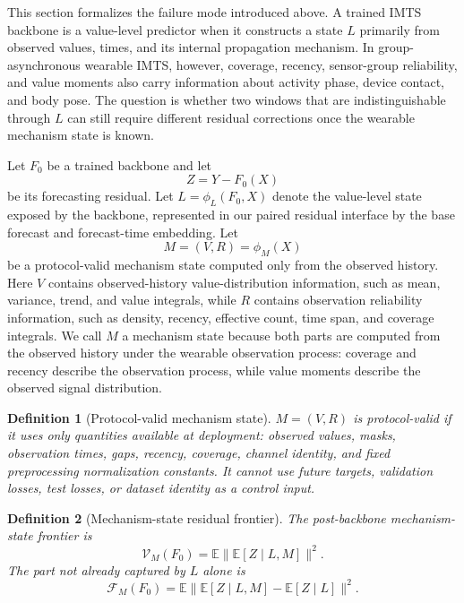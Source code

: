 ﻿\documentclass[10pt,conference]{IEEEtran}
\newtheorem{definition}{Definition}
\newcommand{\E}{\mathbb{E}}
\begin{document}
This section formalizes the failure mode introduced above.  A trained IMTS
backbone is a value-level predictor when it constructs a state \(L\) primarily
from observed values, times, and its internal propagation mechanism.  In
group-asynchronous wearable
IMTS, however, coverage, recency, sensor-group reliability, and value moments
also carry information about activity phase, device contact, and body pose.
The question is whether two windows that are indistinguishable through \(L\)
can still require different residual corrections once the wearable mechanism
state is known.

Let \(F_0\) be a trained backbone and let
\begin{equation}
Z=Y-F_0(X)
\end{equation}
be its forecasting residual.  Let \(L=\phi_L(F_0,X)\) denote the value-level
state exposed by the backbone, represented in our paired residual interface by
the base forecast and forecast-time embedding.  Let
\begin{equation}
M=(V,R)=\phi_M(X)
\end{equation}
be a protocol-valid mechanism state computed only from the observed history.
Here \(V\) contains observed-history value-distribution information, such as
mean, variance, trend, and value integrals, while \(R\) contains observation
reliability information, such as density, recency, effective count, time span,
and coverage integrals.  We call \(M\) a mechanism state because both parts are
computed from the observed history under the wearable observation process:
coverage and recency describe the observation process, while value moments
describe the observed signal distribution.

\begin{definition}[Protocol-valid mechanism state]
\(M=(V,R)\) is protocol-valid if it uses only quantities available at deployment:
observed values, masks, observation times, gaps, recency, coverage, channel
identity, and fixed preprocessing normalization constants.  It cannot use future
targets, validation losses, test losses, or dataset identity as a control
input.
\end{definition}

\begin{definition}[Mechanism-state residual frontier]
The post-backbone mechanism-state frontier is
\begin{equation}
\mathcal{V}_M(F_0)=\E\|\E[Z\mid L,M]\|^2 .
\end{equation}
The part not already captured by \(L\) alone is
\begin{equation}
\mathcal{F}_M(F_0)
=\E\|\E[Z\mid L,M]-\E[Z\mid L]\|^2 .
\end{equation}
\end{definition}
\end{document}
